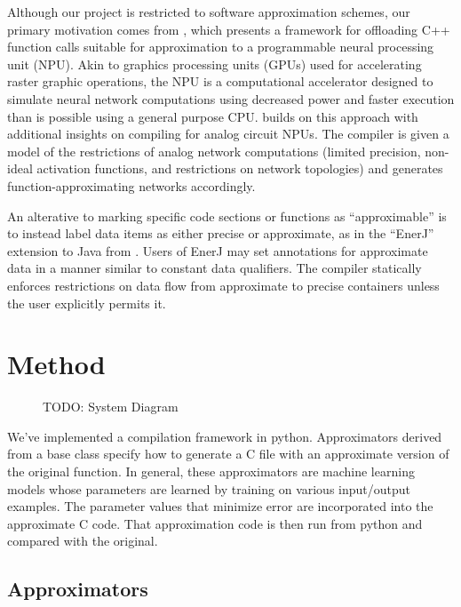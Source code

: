\documentclass{article}
\begin{document}
Although our project is restricted to software approximation schemes, our primary motivation comes from \cite{Esmaeilzadeh12}, which presents a framework for offloading C++ function calls suitable for approximation to a programmable neural processing unit (NPU). Akin to graphics processing units (GPUs) used for accelerating raster graphic operations, the NPU is a computational accelerator designed to simulate neural network computations using decreased power and faster execution than is possible using a general purpose CPU. \cite{Amant14} builds on this approach with additional insights on compiling for analog circuit NPUs. The compiler is given a model of the restrictions of analog network computations (limited precision, non-ideal activation functions, and restrictions on network topologies) and generates function-approximating networks accordingly.

An alterative to marking specific code sections or functions as ``approximable'' is to instead label data items as either precise or approximate, as in the ``EnerJ'' extension to Java from \cite{Sampson11}. Users of EnerJ may set annotations for approximate data in a manner similar to constant data qualifiers. The compiler statically enforces restrictions on data flow from approximate to precise containers unless the user explicitly permits it.

\section{Method}

\begin{figure}
  \centering
  \caption{TODO: System Diagram}
\end{figure}

We've implemented a compilation framework in python. Approximators derived from a base class specify how to generate a C file with an approximate version of the original function. In general, these approximators are machine learning models whose parameters are learned by training on various input/output examples. The parameter values that minimize error are incorporated into the approximate C code. That approximation code is then run from python and compared with the original.

\subsection{Approximators}
\end{document}
